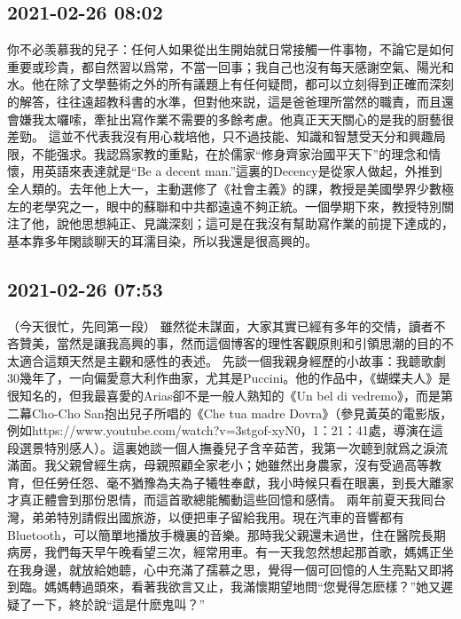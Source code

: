 \documentclass[twocolumn]{ctexart}
\begin{document}
\subsection*{2021-02-26 08:02}

你不必羡慕我的兒子：任何人如果從出生開始就日常接觸一件事物，不論它是如何重要或珍貴，都自然習以爲常，不當一回事；我自己也沒有每天感謝空氣、陽光和水。他在除了文學藝術之外的所有議題上有任何疑問，都可以立刻得到正確而深刻的解答，往往遠超教科書的水準，但對他來説，這是爸爸理所當然的職責，而且還會嫌我太囉嗦，牽扯出寫作業不需要的多餘考慮。他真正天天關心的是我的厨藝很差勁。
這並不代表我沒有用心栽培他，只不過技能、知識和智慧受天分和興趣局限，不能强求。我認爲家教的重點，在於儒家“修身齊家治國平天下”的理念和情懷，用英語來表達就是“Be a decent man.”這裏的Decency是從家人做起，外推到全人類的。去年他上大一，主動選修了《社會主義》的課，教授是美國學界少數極左的老學究之一，眼中的蘇聯和中共都遠遠不夠正統。一個學期下來，教授特別關注了他，說他思想純正、見識深刻；這可是在我沒有幫助寫作業的前提下達成的，基本靠多年閑談聊天的耳濡目染，所以我還是很高興的。
\subsection*{2021-02-26 07:53}

（今天很忙，先囘第一段）
雖然從未謀面，大家其實已經有多年的交情，讀者不吝贊美，當然是讓我高興的事，然而這個博客的理性客觀原則和引領思潮的目的不太適合這類天然是主觀和感性的表述。
先談一個我親身經歷的小故事：我聼歌劇30幾年了，一向偏愛意大利作曲家，尤其是Puccini。他的作品中，《蝴蝶夫人》是很知名的，但我最喜愛的Arias卻不是一般人熟知的《Un bel di vedremo》，而是第二幕Cho-Cho San抱出兒子所唱的《Che tua madre Dovra》（參見黃英的電影版，例如https://www.youtube.com/watch?v=3stgof-xyN0，1：21：41處，導演在這段選景特別感人）。這裏她談一個人撫養兒子含辛茹苦，我第一次聼到就爲之淚流滿面。我父親曾經生病，母親照顧全家老小；她雖然出身農家，沒有受過高等教育，但任勞任怨、毫不猶豫為夫為子犧牲奉獻，我小時候只看在眼裏，到長大離家才真正體會到那份恩情，而這首歌總能觸動這些回憶和感情。
兩年前夏天我囘台灣，弟弟特別請假出國旅游，以便把車子留給我用。現在汽車的音響都有Bluetooth，可以簡單地播放手機裏的音樂。那時我父親還未過世，住在醫院長期病房，我們每天早午晚看望三次，經常用車。有一天我忽然想起那首歌，媽媽正坐在我身邊，就放給她聼，心中充滿了孺慕之思，覺得一個可回憶的人生亮點又即將到臨。媽媽轉過頭來，看著我欲言又止，我滿懷期望地問“您覺得怎麽樣？”她又遲疑了一下，終於說“這是什麽鬼叫？”
\end{document}

